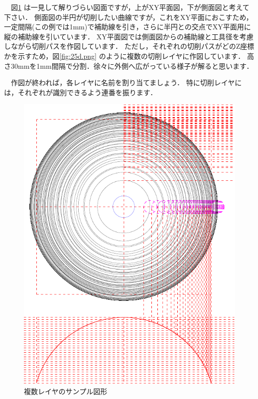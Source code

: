 \begin{minipage}[t]{0.5\textwidth}
　図\ref{fig:25d.pdf} は一見して解りづらい図面ですが，上がXY平面図，下が側面図と考えて下さい．
側面図の半円が切削したい曲線ですが，これをXY平面におこすため，一定間隔(この例では1mm)で補助線を引き，さらに半円との交点でXY平面用に縦の補助線を引いています．
XY平面図では側面図からの補助線と工具径を考慮しながら切削パスを作図しています．
ただし，それぞれの切削パスがどのZ座標かを示すため，図\ref{fig:25d.png} のように複数\footnotemark[1]
の切削レイヤに作図しています．
高さ30mmを1mm間隔で分割．徐々に外側へ広がっている様子が解ると思います．

　作図が終われば，各レイヤに名前を割り当てましょう．
特に切削レイヤには，それぞれが識別できるよう連番を振ります．
\end{minipage}
\begin{minipage}[t]{0.5\textwidth}
\vspace*{-2zh}
\begin{figure}[H]
\centering
\includegraphics[width=\textwidth]{No3/fig/25d-crop.pdf}
\caption{複数レイヤのサンプル図形}
\label{fig:25d.pdf}
\end{figure}
\end{minipage}

